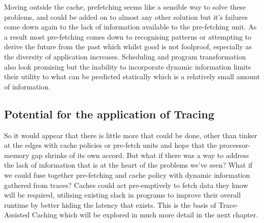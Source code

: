 Moving outside the cache, prefetching seems like a sensible way to solve these problems, and could be added on to almost any other solution but it's failures come down again to the lack of information available to the pre-fetching unit. As a result most pre-fetching comes down to recognising patterns or attempting to derive the future from the past which whilst good is not foolproof, especially as the diversity of application increases. Scheduling and program transformation also look promising but the inability to incorporate dynamic information limits their utility to what can be predicted statically which is a relatively small amount of information. 

\subsection{Potential for the application of Tracing}

So it would appear that there is little more that could be done, other than tinker at the edges with cache policies or pre-fetch units and hope that the processor-memory gap shrinks of its own accord. But what if there was a way to address the lack of information that is at the heart of the problems we've seen? What if we could fuse together pre-fetching and cache policy with dynamic information gathered from traces? Caches could act pre-emptively to fetch data they know will be required, utilising existing slack in programs to improve their overall runtime by better hiding the latency that exists. This is the basis of Trace-Assisted Caching which will be explored in much more detail in the next chapter. 

